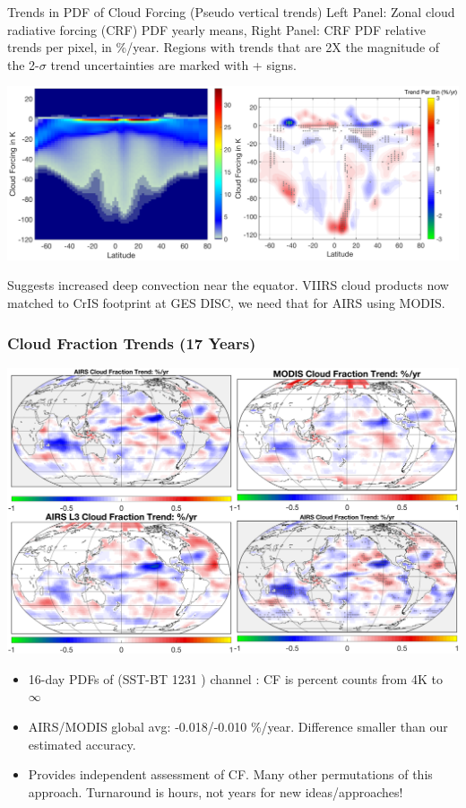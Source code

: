 \documentclass[10pt,t]{beamer}
\begin{document}
\begin{frame}[label={sec:orge76b9d0}]{Trends in PDF of Cloud Forcing (Pseudo vertical trends)}
Left Panel: Zonal cloud radiative forcing (CRF) PDF yearly means, Right Panel: CRF PDF relative trends per pixel, in \%/year.  Regions with trends that are 2X the magnitude of the 2-\(\sigma\) trend uncertainties are marked with + signs.
\begin{center}
\includegraphics[width=\linewidth]{./Yung/bt_forcing_summary.png}
\end{center}

\footnotesize Suggests increased deep convection near the equator.   VIIRS cloud products now matched to CrIS footprint at GES DISC, we need that for AIRS using MODIS.
\end{frame}
\begin{frame}
\frametitle{Cloud Fraction Trends (17 Years)}
\vspace{-0.1in}
\begin{center}
\includegraphics[width=0.85\linewidth]{./Yung/allrate4_small.png}
\end{center}

\vspace{-0.1in}
\footnotesize
\begin{itemize}
\item 16-day PDFs of (SST-BT 1231 \wn) channel : CF is percent counts from 4K to $\infty$
\item AIRS/MODIS global avg: -0.018/-0.010 \%/year.  Difference smaller than our estimated accuracy.
\item Provides independent assessment of CF.  Many other permutations of this approach.  Turnaround is hours, not years for new ideas/approaches!
\end{itemize}
\end{frame}
\end{document}
